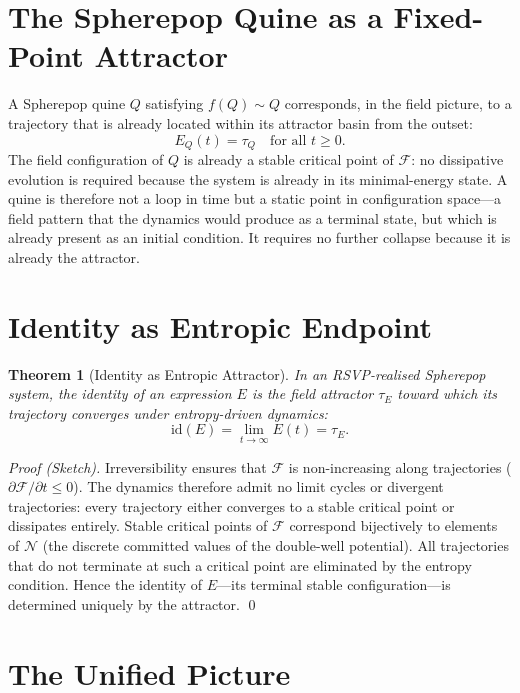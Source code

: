 \documentclass[12pt, oneside]{amsbook}
\theoremstyle{plain}
\newtheorem{theorem}{Theorem}[section]
\theoremstyle{definition}
\theoremstyle{remark}
\newcommand{\NF}{\mathcal{N}}
\newcommand{\evalf}{f}
\newcommand{\tequiv}{\sim}
\begin{document}
\section{The Spherepop Quine as a Fixed-Point Attractor}

A Spherepop quine $Q$ satisfying $\evalf(Q) \tequiv Q$ corresponds, in the
field picture, to a trajectory that is already located within its attractor
basin from the outset:
\[
  E_Q(t) = \tau_Q \quad \text{for all } t \geq 0.
\]
The field configuration of $Q$ is already a stable critical point of
$\mathcal{F}$: no dissipative evolution is required because the system is
already in its minimal-energy state. A quine is therefore not a loop in time
but a static point in configuration space---a field pattern that the dynamics
would produce as a terminal state, but which is already present as an initial
condition. It requires no further collapse because it is already the attractor.

\section{Identity as Entropic Endpoint}

\begin{theorem}[Identity as Entropic Attractor]
\label{thm:identity-attractor}
In an RSVP-realised Spherepop system, the identity of an expression $E$ is
the field attractor $\tau_E$ toward which its trajectory converges under
entropy-driven dynamics:
\[
  \mathrm{id}(E) = \lim_{t \to \infty} E(t) = \tau_E.
\]
\end{theorem}

\begin{proof}[Proof (Sketch)]
Irreversibility ensures that $\mathcal{F}$ is non-increasing along
trajectories ($\partial \mathcal{F}/\partial t \leq 0$). The dynamics
therefore admit no limit cycles or divergent trajectories: every trajectory
either converges to a stable critical point or dissipates entirely.
Stable critical points of $\mathcal{F}$ correspond bijectively to elements
of $\NF$ (the discrete committed values of the double-well potential).
All trajectories that do not terminate at such a critical point are
eliminated by the entropy condition. Hence the identity of $E$---its
terminal stable configuration---is determined uniquely by the attractor. \qed
\end{proof}

\section{The Unified Picture}
\end{document}
